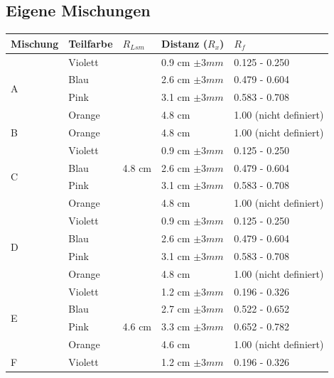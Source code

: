 \documentclass[11pt,paper=a4,final]{scrartcl}
\begin{document}
\subsection{Eigene Mischungen}
\begin{savenotes}
  \begin{table}[ht!]
    \centering
    \begin{tabular}{|l|l|l|l|l|}
      \hline
      \bf Mischung	& \bf Teilfarbe	& \bf \(R_{Lsm}\)		& \bf Distanz (\(R_x\))	& \(R_f\)		\\ \hline
      \multirow{4}{*}{A}
			& Violett	& \multirow{13}{*}{4.8 cm }	& 0.9 cm \(\pm 3 mm \)	& 0.125 - 0.250		\\
      			& Blau		& 				& 2.6 cm \(\pm 3 mm \)	& 0.479 - 0.604		\\
      			& Pink		&				& 3.1 cm \(\pm 3 mm \)	& 0.583 - 0.708		\\
      			& Orange	&				& 4.8 cm 		& 1.00 (nicht definiert)\\ \cline{1-2} \cline{4-5}
       B		& Orange	&				& 4.8 cm		& 1.00 (nicht definiert)\\ \cline{1-2} \cline{4-5}
      \multirow{4}{*}{C}
			& Violett	& 				& 0.9 cm \(\pm 3 mm \)	& 0.125 - 0.250		\\
      			& Blau		& 				& 2.6 cm \(\pm 3 mm \)	& 0.479 - 0.604		\\
      			& Pink		&				& 3.1 cm \(\pm 3 mm \)	& 0.583 - 0.708		\\
      			& Orange	&				& 4.8 cm 		& 1.00 (nicht definiert)\\ \cline{1-2} \cline{4-5}
      \multirow{4}{*}{D}
			& Violett	&				& 0.9 cm \(\pm 3 mm \)	& 0.125 - 0.250		\\
      			& Blau		& 				& 2.6 cm \(\pm 3 mm \)	& 0.479 - 0.604		\\
      			& Pink		&				& 3.1 cm \(\pm 3 mm \)	& 0.583 - 0.708		\\
      			& Orange	&				& 4.8 cm 		& 1.00 (nicht definiert)\\ \hline
      \multirow{4}{*}{E}
			& Violett	& \multirow{18}{*}{4.6 cm }	& 1.2 cm \(\pm 3 mm \)	& 0.196 - 0.326		\\
      			& Blau		& 				& 2.7 cm \(\pm 3 mm \)	& 0.522 - 0.652		\\
      			& Pink		&				& 3.3 cm \(\pm 3 mm \)	& 0.652 - 0.782		\\
			& Orange	&				& 4.6 cm 		& 1.00 (nicht definiert)\\ \cline{1-2} \cline{4-5}
      \multirow{4}{*}{F}
			& Violett	&				& 1.2 cm \(\pm 3 mm \)	& 0.196 - 0.326		\\

\end{tabular}
\end{table}
\end{savenotes}
\end{document}
